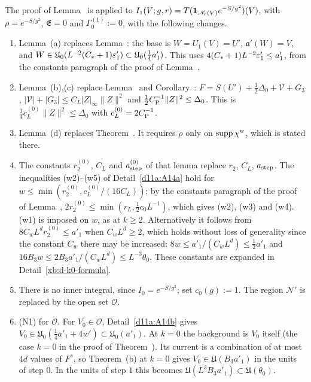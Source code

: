 \begin{detail}\label{d11a:A15}
\begin{step}[$k=1$: the list of changes]
The proof of Lemma~ is applied to $I_1(V;g,r)=T(\mathbf 1_{\mathscr N_r(V)}e^{-S/g^2})(V)$, with $\rho=e^{-S/g^2}$, $\mathfrak E=0$ and $\Gamma^{(1)}_0:=0$, with the following changes.
\begin{enumerate}[label=(\roman*)]
\item Lemma~(a) replaces Lemma~: the base is $W=U_1(V)=U'$, $\mathfrak a'(W)=V$, and $W\in\mathfrak U_0(L^{-2}(C_*+1)\varepsilon'_1)\subset\mathfrak U_0(\frac14a'_1)$. This uses $4(C_*+1)L^{-2}\varepsilon'_1\le a'_1$, from the constants paragraph of the proof of Lemma~.
\item Lemma~(b),(c) replace Lemma~ and Corollary~: $F=S(U')+\frac12\Delta_0+\mathcal V+G_3$, $|\mathcal V|+|G_3|\le C_L|Z|_\infty\|Z\|^2$ and $\frac12C_{\rm P}^{-1}\|Z\|^2\le\Delta_0$. This is $\frac14c^{(0)}_L\|Z\|^2\le\Delta_0$ with $c^{(0)}_L=2C_{\rm P}^{-1}$.
\item Lemma~(d) replaces Theorem~. It requires $\rho$ only on $\operatorname{supp}\chi^{\rm w}$, which is stated there.
\item The constants $r^{(0)}_2$, $C_L$ and $a^{(0)}_{\rm step}$ of that lemma replace $r_2$, $C_L$, $a_{\rm step}$. The inequalities (w2)--(w5) of Detail~\ref{d11a:A14a} hold for $w\le\min(r^{(0)}_2,c^{(0)}_L/(16C_L))$: by the constants paragraph of the proof of Lemma~, $2r^{(0)}_2\le\min(r_L,\frac12c_0L^{-1})$, which gives (w2), (w3) and (w4). (w1) is imposed on $w$, as at $k\ge2$. Alternatively it follows from $8C_wL^dr^{(0)}_2\le a'_1$ when $C_wL^d\ge2$, which holds without loss of generality since the constant $C_w$ there may be increased: $8w\le a'_1/(C_wL^d)\le\frac12a'_1$ and $16B_3w\le2B_3a'_1/(C_wL^d)\le L^{-3}\theta_0$. These constants are expanded in Detail~\ref{xb:d-k0-formula}.
\item There is no inner integral, since $I_0=e^{-S/g^2}$; set $c_0(g):=1$. The region $\mathscr N'$ is replaced by the open set $\mathscr O$.
\item (N1) for $\mathscr O$. For $V_0\in\mathscr O$, Detail~\ref{d11a:A14b} gives $V_0\in\mathfrak U_0(\frac14a'_1+4w')\subset\mathfrak U_0(a'_1)$. At $k=0$ the background is $V_0$ itself (the case $k=0$ in the proof of Theorem~). Its current is a combination of at most $4d$ values of $F^s$, so Theorem~(b) at $k=0$ gives $V_0\in\mathfrak U(B_3a'_1)$ in the units of step $0$. In the units of step $1$ this becomes $\mathfrak U(L^3B_3a'_1)\subset\mathfrak U(\theta_0)$.

\end{enumerate}
\end{step}
\end{detail}
